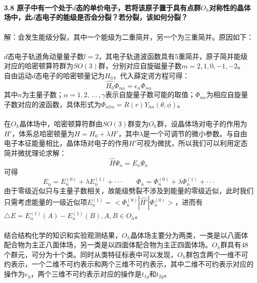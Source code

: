 \documentclass[12pt]{article}
\numberwithin{equation}{section}	 %
\begin{document}
\begin{spacing}{1.5}
~\\
~\\
~\\
\textbf{3.8 \quad 原子中有一个处于$d$态的单价电子，若将该原子置于具有点群$O_{h}$对称性的晶体场中，此$d$态电子的能级是否会分裂？若分裂，该如何分裂？}\\
~\\
解：会发生能级分裂，其中一个能级为二重简并，另一个为三重简并。原因如下：\\
~\\
$d$态电子轨道角动量量子数$l=2$，其电子轨道波函数具有$5$重简并，原子简并能级对应的哈密顿算符群为$SO(3)$群，分别对应自旋磁量子数$m=2,1,0,-1,-2$。
自由运动$d$态电子的哈密顿量记为$H_{0}$，代入薛定谔方程可得：\\
\begin{equation}
\hat{H_{0}}\Phi_{n\alpha} = \epsilon_{n}\Phi_{n\alpha}
\end{equation}
其中$n$为主量子数；$\alpha = 1,2, \, ... \,, \gamma$表示自旋量子数可能的取值；$\Phi_{n\alpha}$为相应自旋量子数对应的波函数，具体形式为$\Phi_{nlm} = R(r)Y_{lm}(\theta,\phi)$。\\
~\\
在$O_{h}$晶体场中，哈密顿算符群由$SO(3)$群变为$O_{h}$群，设晶体场对电子的作用为$H'$，体系总哈密顿量为$H = H_{0} + \lambda H'$，其中$\lambda$是一个可调节的微小参数。与自由电子本征能量相比，晶体场对电子的作用$H'$可视为微扰，所以我们可以利用定态简并微扰理论求解：
\begin{equation}
\hat{H}\Psi_{n} = E_{n}\Psi_{n}
\end{equation}
可得
\begin{equation}
E_{n} = E_{n}^{(0)} + \lambda E_{n}^{(1)} + \cdot\cdot\cdot \qquad \Phi_{n} = \Phi_{n}^{(0)} + \lambda\Phi_{n}^{(1)} + \cdot\cdot\cdot
\end{equation}
由于零级近似只与主量子数相关，故能级劈裂不涉及到能量的零级近似，此时我们只需考虑能量的一级近似项$\displaystyle E_{n}^{(1)} = <\Phi_{n}^{(0)}|\hat{H'}|\Phi_{n}^{(0)}>$，进而有$\displaystyle \triangle E = E_{n}^{(1)}(A) - E_{n}^{(1)}(B), A,B \in O_{h}$。\\
~\\
结合结构化学的知识和实验观测结果，$O_{h}$晶体场主要分为两类，一类是以八面体配合物为主正八面体场，另一类是以四面体配合物为主正四面体场。$O_{h}$群具有$48$个群元，可分为十个类。同时从类特征标表中可以发现，$O_{h}$群包含两个一维不可约表示，一个二维不可约表示和两个三维不可约表示，其中二维不可约表示对应的操作为$e_{g}$，两个三维不可约表示对应的操作是$t_{1g}$和$t_{2g}$。\\

\end{spacing}
\end{document}

